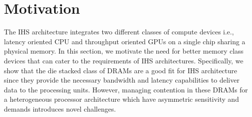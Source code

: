 \section{Motivation} \label{motivation}
The IHS architecture integrates two different classes of compute devices i.e., latency oriented CPU and throughput oriented GPUs on a single chip sharing a physical memory. In this section, we motivate the need for better memory class devices that can cater to the requirements of IHS architectures. Specifically, we show that the die stacked class of DRAMs are a good fit for IHS architecture since they provide the necessary bandwidth and latency capabilities to deliver data to the processing units. However, managing contention in these DRAMs for a heterogeneous processor architecture which have asymmetric sensitivity and demands introduces novel challenges.

